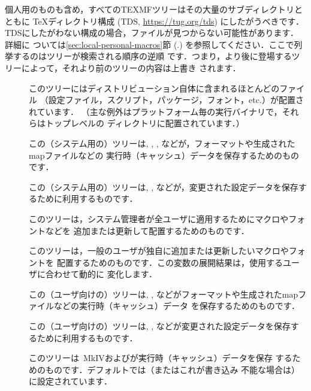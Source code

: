 \documentclass[uplatex,dvipdfmx,tombow]{jsarticle}
\begin{document}
個人用のものも含め，すべてのTEXMFツリーはその大量のサブディレクトリとともに
\TeX ディレクトリ構成 (TDS, \url{https://tug.org/tds}) にしたがうべきです．
TDSにしたがわない構成の場合，ファイルが見つからない可能性があります．詳細に
ついては\ref{sec:local-personal-macros}節 (\p.\pageref{sec:local-personal-%
macros}) を参照してください．ここで列挙するのはツリーが検索される順序の逆順
です．つまり，より後に登場するツリーによって，それより前のツリーの内容は上書き
されます．
%
\begin{description}
\item[]
このツリーには\TL ディストリビューション自体に含まれるほとんどのファイル
（設定ファイル，スクリプト，パッケージ，フォント，etc.）が配置されています．
（主な例外はプラットフォーム毎の実行バイナリで，それらはトップレベルの
ディレクトリに配置されています．）

\item[]
この（システム用の）ツリーは, , , などが，フォーマットや生成されたmapファイルなどの
実行時（キャッシュ）データを保存するためのものです．

\item[]
この（システム用の）ツリーは, , などが，変更された設定データを保存するために利用するものです．

\item[]
このツリーは，システム管理者が全ユーザに適用するためにマクロやフォントなどを
追加または更新して配置するためのものです．

\item[]
このツリーは，一般のユーザが独自に追加または更新したいマクロやフォントを
配置するためのものです．この変数の展開結果は，使用するユーザに合わせて動的に
変化します．

\item[]
この（ユーザ向けの）ツリーは, , などがフォーマットや生成されたmapファイルなどの実行時（キャッシュ）データ
を保存するためのものです．

\item[]
この（ユーザ向けの）ツリーは, , などが変更された設定データを保存するために利用するものです．

\item[]
このツリーは\ConTeXt\ MkIVおよび\LuaLaTeX が実行時（キャッシュ）データを保存
するためのものです．デフォルトでは（またはこれが書き込み
不能な場合は）に設定されています．
\end{description}
\end{document}
